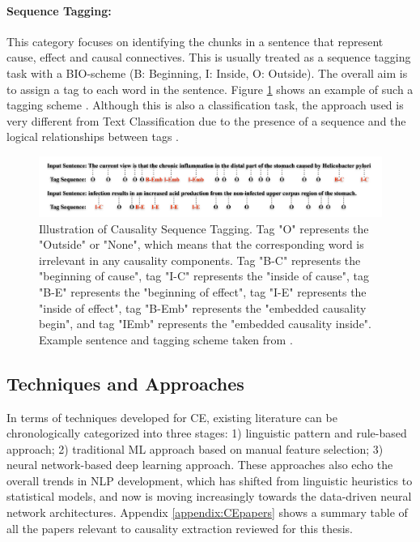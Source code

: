 \paragraph{Sequence Tagging:} This category focuses on identifying the chunks in a sentence that represent cause, effect and causal connectives. This is usually treated as a sequence tagging task with a BIO-scheme (B: Beginning, I: Inside, O: Outside). The overall aim is to assign a tag to each word in the sentence. Figure \ref{fig:BIOtags} shows an example of such a tagging scheme \cite{Li21BiLSTMCRF}. Although this is also a classification task, the approach used is very different from Text Classification due to the presence of a sequence and the logical relationships between tags \cite{Ali21Survey, FinCausal20, Xu20Review}.

\begin{figure}[h!]
\centering
  \includegraphics[scale=0.45]{figures/BIO.png}
  \caption{Illustration of Causality Sequence Tagging. Tag "O" represents the "Outside" or "None", which means that the corresponding word is irrelevant in any causality components. Tag "B-C" represents the "beginning of cause", tag "I-C" represents the "inside of cause", tag "B-E" represents the "beginning of effect", tag "I-E" represents the "inside of effect", tag "B-Emb" represents the "embedded causality begin", and tag "IEmb" represents the "embedded causality inside". Example sentence and tagging scheme taken from \cite{Li21BiLSTMCRF}.}
  \label{fig:BIOtags}
\end{figure}


\subsection{Techniques and Approaches}

In terms of techniques developed for CE, existing literature can be chronologically categorized into three stages: 1) linguistic pattern and rule-based approach; 2) traditional ML approach based on manual feature selection; 3) neural network-based deep learning approach. These approaches also echo the overall trends in NLP development, which has shifted from linguistic heuristics to statistical models, and now is moving increasingly towards the data-driven neural network architectures. Appendix \ref{appendix:CEpapers} shows a summary table of all the papers relevant to causality extraction reviewed for this thesis.




